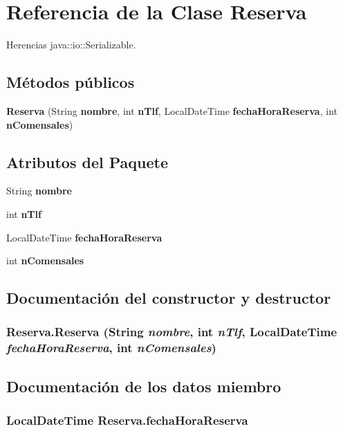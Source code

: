 \section{Referencia de la Clase Reserva}
\label{class_reserva}
Herencias java::io::Serializable.

\subsection*{Métodos públicos}
\begin{CompactItemize}
\item 
{\bf Reserva} (String {\bf nombre}, int {\bf nTlf}, LocalDateTime {\bf fechaHoraReserva}, int {\bf nComensales})
\end{CompactItemize}
\subsection*{Atributos del Paquete}
\begin{CompactItemize}
\item 
String {\bf nombre}
\item 
int {\bf nTlf}
\item 
LocalDateTime {\bf fechaHoraReserva}
\item 
int {\bf nComensales}
\end{CompactItemize}


\subsection{Documentación del constructor y destructor}
\subsubsection[{Reserva}]{\setlength{\rightskip}{0pt plus 5cm}Reserva.Reserva (String {\em nombre}, \/  int {\em nTlf}, \/  LocalDateTime {\em fechaHoraReserva}, \/  int {\em nComensales})}\label{class_reserva_861adad727ac14cbbe32dbdf8806eff3}




\subsection{Documentación de los datos miembro}
\subsubsection[{fechaHoraReserva}]{\setlength{\rightskip}{0pt plus 5cm}LocalDateTime {\bf Reserva.fechaHoraReserva}\hspace{0.3cm}{\tt  [package]}}\label{class_reserva_baccce4455384f30534ee0c890ec2b1c}


